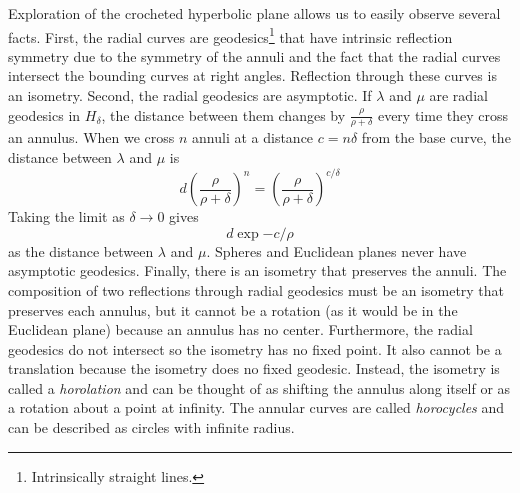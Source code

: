\documentclass[letterpaper,titlepage]{article}
\begin{document}
Exploration of the crocheted hyperbolic plane allows us to easily observe several facts.
First, the radial curves are geodesics\footnote{Intrinsically straight lines.} that have intrinsic reflection symmetry due to the symmetry of the annuli and the fact that the radial curves intersect the bounding curves at right angles.
Reflection through these curves is an isometry.
Second, the radial geodesics are asymptotic.
If $\lambda$ and $\mu$ are radial geodesics in $H_\delta$, the distance between them changes by $\frac{\rho}{\rho+\delta}$ every time they cross an annulus.
When we cross $n$ annuli at a distance $c = n\delta$ from the base curve, the distance between $\lambda$ and $\mu$ is
\[ d \left( \frac{\rho}{\rho+\delta} \right)^n =  \left( \frac{\rho}{\rho+\delta} \right)^{c/\delta} \]
Taking the limit as $\delta \to 0$ gives
\begin{equation}
d \exp{-c/\rho}
\label{distance}
\end{equation}
as the distance between $\lambda$ and $\mu$.
Spheres and Euclidean planes never have asymptotic geodesics.
Finally, there is an isometry that preserves the annuli.
The composition of two reflections through radial geodesics must be an isometry that preserves each annulus, but it cannot be a rotation (as it would be in the Euclidean plane) because an annulus has no center.
Furthermore, the radial geodesics do not intersect so the isometry has no fixed point.
It also cannot be a translation because the isometry does no fixed geodesic.
Instead, the isometry is called a \emph{horolation} and can be thought of as shifting the annulus along itself or as a rotation about a point at infinity.
The annular curves are called \emph{horocycles} and can be described as circles with infinite radius.\cite{crochetplane}
\end{document}
